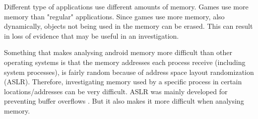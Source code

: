 Different type of applications use different amounts of memory. Games use more memory than "regular" applications.
Since games use more memory, also dynamically, objects not being used in the memory can be erased. This can result in
loss of evidence that may be useful in an investigation.

Something that makes analysing android memory more difficult than other operating systems is that the memory addresses 
each process receive (including system processes), is fairly random because of address space layout randomization (ASLR). 
Therefore, investigating memory used by a specific process in certain locations/addresses can be very difficult.
ASLR was mainly developed for preventing buffer overflows \cite{prot_aslr}. But it also makes it more difficult when 
analysing memory.





%
%

